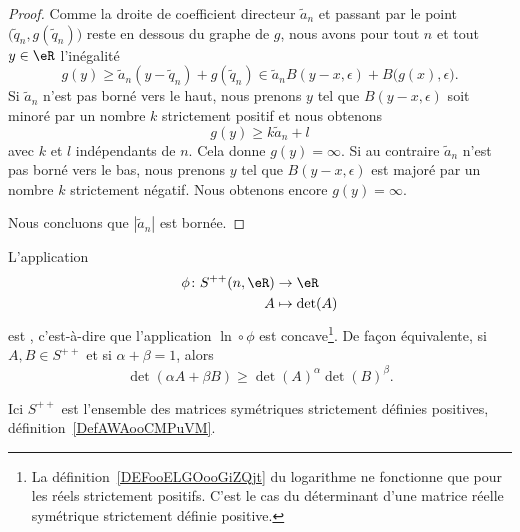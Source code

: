 \begin{proof}
	Comme la droite de coefficient directeur \( \tilde a_n\) et passant par le point \( \big( \tilde q_n,g(\tilde q_n) \big)\) reste en dessous du graphe de \( g\), nous avons pour tout \( n\) et tout \( y\in \eR\) l'inégalité
	\begin{equation}
		g(y)\geq \tilde a_n(y-\tilde q_n)+g(\tilde q_n)\in \tilde a_nB(y-x,\epsilon)+B\big( g(x),\epsilon \big).
	\end{equation}
	Si \( \tilde a_n\) n'est pas borné vers le haut, nous prenons \( y\) tel que \( B(y-x,\epsilon)\) soit minoré par un nombre \( k\) strictement positif et nous obtenons
	\begin{equation}
		g(y)\geq k\tilde a_n+l
	\end{equation}
	avec \( k\) et \( l\) indépendants de \( n\). Cela donne \( g(y)=\infty\). Si au contraire \( \tilde a_n\) n'est pas borné vers le bas, nous prenons \( y\) tel que \( B(y-x,\epsilon)\) est majoré par un nombre \( k\) strictement négatif. Nous obtenons encore \( g(y)=\infty\).

	Nous concluons que \( | \tilde a_n |\) est bornée.
\end{proof}

\begin{lemma}   \label{LemXOUooQsigHs}
	L'application
	\begin{equation}
		\begin{aligned}
			\phi\colon S^{++}(n,\eR) & \to \eR         \\
			A                        & \mapsto \det(A)
		\end{aligned}
	\end{equation}
	est , c'est-à-dire que l'application \( \ln\circ\phi\) est concave\footnote{La définition~\ref{DEFooELGOooGiZQjt} du logarithme ne fonctionne que pour les réels strictement positifs. C'est le cas du déterminant d'une matrice réelle symétrique strictement définie positive.}. De façon équivalente, si \( A,B\in S^{++}\) et si \( \alpha+\beta=1\), alors
	\begin{equation}    \label{EqSPKooHFZvmB}
		\det(\alpha A+\beta B)\geq \det(A)^{\alpha}\det(B)^{\beta}.
	\end{equation}
\end{lemma}
Ici \( S^{++}\) est l'ensemble des matrices symétriques strictement définies positives, définition~\ref{DefAWAooCMPuVM}.

